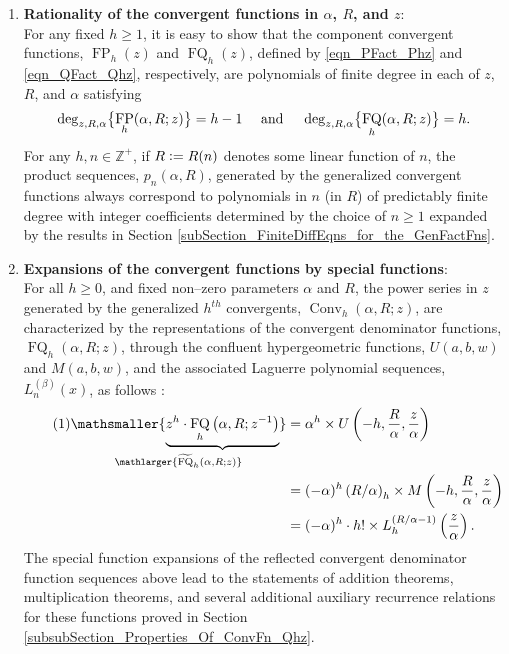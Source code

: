 \documentclass[12pt,reqno]{article}
\numberwithin{sfootnote}{section}
\numberwithin{equation}{section}
\newcommand{\tagonce}[0]{
     \addtocounter{equation}{1}
     \tag{\theequation}
}
\newcommand{\itemlabel}[1]{\textbf{#1}: \\ }
\theoremstyle{plain}
\theoremstyle{definition}
\theoremstyle{remark}
\newcommand{\defequals}{\ensuremath{\vcentcolon=}}
\newcommand{\undersetbrace}[2]{\ensuremath{\underset{\mathlarger{#1}}{\mathsmaller{\underbrace{#2}}}}}
\newcommand{\Pochhammer}[2]{\ensuremath{\left(#1\right)_{#2}}}
\newcommand{\HypU}[3]{\ensuremath{U\left(#1, #2, #3\right)}}
\newcommand{\HypM}[3]{\ensuremath{M\left(#1, #2, #3\right)}}
\newcommand{\ConvGF}[4]{\ensuremath{\Conv_{#1}\left(#2, #3; #4\right)}}
\DeclareMathOperator{\FP}{FP}
\DeclareMathOperator{\FQ}{FQ}
\DeclareMathOperator{\Conv}{Conv}
\begin{document}
\begin{enumerate} 

\item \itemlabel{Rationality of the convergent functions in $\alpha$, $R$, and $z$} 
For any fixed $h \geq 1$, it is easy to show that the 
component convergent functions, $\FP_h(z)$ and $\FQ_h(z)$, 
defined by \eqref{eqn_PFact_Phz} and \eqref{eqn_QFact_Qhz}, respectively, 
are polynomials of finite degree in each of $z$, $R$, and $\alpha$ 
satisfying 
\begin{equation} 
\notag 
\deg_{z,R,\alpha}\bigl\{ \FP_h(\alpha, R; z) \bigr\} = h-1 
     \quad \text{ and } \quad 
\deg_{z,R,\alpha}\bigl\{ \FQ_h(\alpha, R; z) \bigr\} = h. 
\end{equation} 
For any $h, n \in \mathbb{Z}^{+}$, if $R \defequals R(n)$ 
denotes some linear function of $n$, the product sequences, 
$p_n(\alpha, R)$, 
generated by the generalized convergent functions 
always correspond to polynomials in $n$ (in $R$) 
of predictably finite degree with integer coefficients determined by the 
choice of $n \geq 1$ expanded by the results in 
Section \ref{subSection_FiniteDiffEqns_for_the_GenFactFns}. 

\item \itemlabel{Expansions of the convergent functions by 
                 special functions} 
For all $h \geq 0$, and fixed non--zero parameters $\alpha$ and $R$, the 
power series in $z$ generated by the generalized $h^{th}$ 
convergents, $\ConvGF{h}{\alpha}{R}{z}$, are characterized by the 
representations of the convergent denominator functions, 
$\FQ_h(\alpha, R; z)$, through the 
confluent hypergeometric functions, 
$\HypU{a}{b}{w}$ and $\HypM{a}{b}{w}$, and the 
associated Laguerre polynomial sequences, $L_n^{(\beta)}(x)$, 
as follows \citep[\S 13; \S 18]{NISTHB} \citep[\S 4.3.1]{UC}: 
\begin{align*} 
\tagonce\label{eqn_PFact_Qhz_Exp_idents-stmts_v1} 
\undersetbrace{\widetilde{\FQ}_h(\alpha, R; z)}{ 
     z^{h} \cdot \FQ_h\left(\alpha, R; z^{-1}\right) 
} & = 
     \alpha^{h} \times \HypU{-h}{\frac{R}{\alpha}}{\frac{z}{\alpha}} \\ 
     & = 
     (-\alpha)^{h} \Pochhammer{R / \alpha}{h} \times 
     \HypM{-h}{\frac{R}{\alpha}}{\frac{z}{\alpha}} \\ 
     & = 
     (-\alpha)^{h} \cdot h! \times 
     L_h^{(R / \alpha - 1)}\left(\frac{z}{\alpha}\right). 
\end{align*} 
The special function expansions of the reflected convergent denominator 
function sequences above lead to the statements of 
addition theorems, multiplication theorems, and 
several additional auxiliary recurrence relations for these functions 
proved in Section \ref{subsubSection_Properties_Of_ConvFn_Qhz}. 


\end{enumerate}
\end{document}
